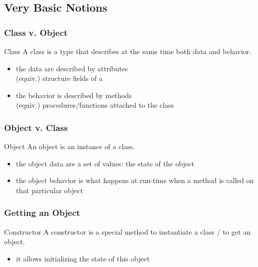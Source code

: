 \documentclass{beamer}
\newcommand{\kw}[1]{{\color{blue}{\texttt{#1}}}\xspace}
\newcommand{\struct}{\kw{struct}}
\begin{document}
\subsection{Very Basic Notions}

\begin{frame}
  \frametitle{Class v. Object}

  \begin{block}{Class}
    A class is a type that describes at the same time both data and behavior.
    \smallskip

    \begin{itemize}
    \item the data are described by attributes\\
      (equiv.) structure fields of a \struct
      \smallskip
    \item the behavior is described by methods\\
      (equiv.) procedures/functions attached to the class
    \end{itemize}

  \end{block}

\end{frame}


\begin{frame}
  \frametitle{Object v. Class}

  \begin{block}{Object}
    An object is an instance of a class.
    \smallskip

    \begin{itemize}
    \item the object data are a set of values: the state of the object
      \smallskip
    \item the object behavior is what happens at run-time when a
      method is called on that particular object
    \end{itemize}
  \end{block}

\end{frame}


\begin{frame}
  \frametitle{Getting an Object}

  \begin{block}{Constructor}
    A constructor is a special method to instantiate a class / to get
    an object.

    \begin{itemize}
    \item it allows initializing the state of this object
    \end{itemize}
  \end{block}

\end{frame}
\end{document}
